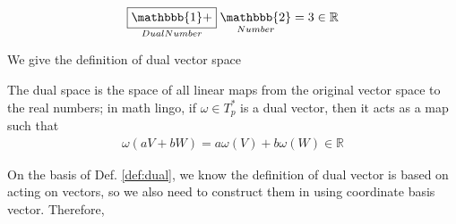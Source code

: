 \begin{align}
    \underset{Dual Number}{\boxed{\mathbbb{1}+}}\;\underset{Number}{\mathbbb{2}}=3\in \mathbb{R}
\end{align}

We give the definition of dual vector space 

\begin{tcolorbox}[title=\textbf{Dual Vector Space},colback=SeaGreen!10!CornflowerBlue!10,colframe=RoyalPurple!55!Aquamarine!100!]
    The dual space is the space of all linear maps from the original vector space to the real numbers; in math lingo, if $\omega\in T_{p}^*$  is a dual vector, then it acts as a map such that
    \begin{align}
        \omega(aV+bW)=a\omega (V)+b\omega (W)\in \mathbb{R}\label{def:dual}
    \end{align}
\end{tcolorbox}

On the basis of Def. \ref{def:dual}, we know the definition of dual vector is based on acting on vectors, so we also need to construct them in using coordinate basis vector. Therefore, 